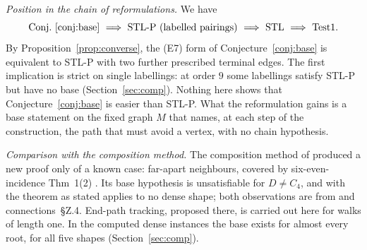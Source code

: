 \documentclass[11pt]{amsart}
\theoremstyle{definition}
\newcommand{\STL}{\mathrm{STL}}
\begin{document}
\emph{Position in the chain of reformulations.} We have
\[
\text{Conj.~\ref{conj:base}}\ \Longrightarrow\ \text{STL-P (labelled pairings)}\ \Longrightarrow\
\STL\ \Longrightarrow\ \mathrm{Test1}.
\]
By Proposition~\ref{prop:converse}, the (E7) form of Conjecture~\ref{conj:base} is equivalent to
STL-P with two further prescribed terminal edges. The first implication is strict on single
labellings: at order $9$ some labellings satisfy STL-P but have no base
(Section~\ref{sec:comp}). Nothing here shows that Conjecture~\ref{conj:base} is easier than
STL-P. What the reformulation gains is a base statement on the fixed graph $M$ that names, at each
step of the construction, the path that must avoid a vertex, with no chain hypothesis.

\emph{Comparison with the composition method.} The composition method of \cite{TM} produced a
new proof only of a known case: far-apart neighbours, covered by six-even-incidence Thm~1(2)
\cite[Rem.~8.5]{TM}. Its base hypothesis is unsatisfiable for $D\ne C_4$, and with
\cite[Def.~8.1(ii)]{TM} the theorem as stated applies to no dense shape; both observations are
from \cite[\S9(1)]{TM} and connections~\S Z.4. End-path tracking, proposed there, is carried out
here for walks of length one. In the computed dense instances the base exists for almost every
root, for all five shapes (Section~\ref{sec:comp}).
\end{document}
